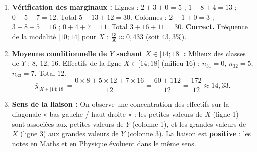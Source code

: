 \documentclass[11pt]{article}
\begin{document}
\begin{corrige}
\begin{enumerate}
\item \textbf{Vérification des marginaux :}
Lignes : $2+3+0=5$ ; $1+8+4=13$ ; $0+5+7=12$. Total $5+13+12=30$.
Colonnes : $2+1+0=3$ ; $3+8+5=16$ ; $0+4+7=11$. Total $3+16+11=30$. \textbf{Correct.}
Fréquence de la modalité $[10;14[$ pour $X$ : $\frac{13}{30} \approx 0,433$ (soit $43,3\%$).

\item \textbf{Moyenne conditionnelle de $Y$ sachant $X \in [14;18[$ :}
Milieux des classes de $Y$ : $8$, $12$, $16$.
Effectifs de la ligne $X \in [14;18[$ (milieu $16$) : $n_{31}=0$, $n_{32}=5$, $n_{33}=7$. Total $12$.
\[
\bar{y}_{|X\in[14;18[} = \frac{0\times 8 + 5\times 12 + 7\times 16}{12} = \frac{60 + 112}{12} = \frac{172}{12} \approx 14,33.
\]

\item \textbf{Sens de la liaison :} On observe une concentration des effectifs sur la diagonale « bas-gauche / haut-droite » : les petites valeurs de $X$ (ligne 1) sont associées aux petites valeurs de $Y$ (colonne 1), et les grandes valeurs de $X$ (ligne 3) aux grandes valeurs de $Y$ (colonne 3). La liaison est \textbf{positive} : les notes en Maths et en Physique évoluent dans le même sens.
\end{enumerate}
\end{corrige}
\end{document}
